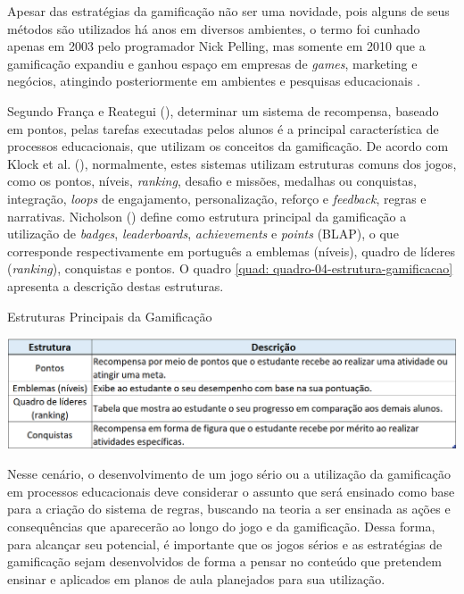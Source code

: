 Apesar das estratégias da gamificação não ser uma novidade, pois alguns de seus métodos são utilizados há anos em diversos ambientes, o termo foi cunhado apenas em 2003 pelo programador Nick Pelling, mas somente em 2010 que a gamificação expandiu e ganhou espaço em empresas de \textit{games}, marketing e negócios, atingindo posteriormente em ambientes e pesquisas educacionais \cite{alves2015}.

Segundo França e Reategui (\citeyear{franca2014}), determinar um sistema de recompensa, baseado em pontos, pelas tarefas executadas pelos alunos é a principal característica de processos educacionais, que utilizam os conceitos da gamificação. De acordo com Klock et al. (\citeyear{klock2014}), normalmente, estes sistemas utilizam estruturas comuns dos jogos, como os pontos, níveis, \textit{ranking}, desafio e missões, medalhas ou conquistas, integração, \textit{loops} de engajamento, personalização, reforço e \textit{feedback}, regras e narrativas. Nicholson (\citeyear{nicholson2012}) define como estrutura principal da gamificação a utilização de \textit{badges}, \textit{leaderboards}, \textit{achievements} e \textit{points} (BLAP), o que corresponde respectivamente em português a emblemas (níveis), quadro de líderes (\textit{ranking}), conquistas e pontos. O quadro \ref{quad: quadro-04-estrutura-gamificacao} apresenta a descrição destas estruturas.


\graphicspath{{quadros/}}
\begin{quadro}[!ht]
\centering
\begin{minipage}{1.\textwidth}
\caption{Estruturas Principais da Gamificação}
\centering
\includegraphics[width=1.0\textwidth]{quadro-04-estrutura-gamificacao.png}
\label{quad: quadro-04-estrutura-gamificacao}
\end{minipage}
\end{quadro}

Nesse cenário, o desenvolvimento de um jogo sério ou a utilização da gamificação em processos educacionais deve considerar o assunto que será ensinado como base para a criação do sistema de regras, buscando na teoria a ser ensinada as ações e consequências que aparecerão ao longo do jogo e da gamificação. Dessa forma, para alcançar seu potencial, é importante que os jogos sérios e as estratégias de gamificação sejam desenvolvidos de forma a pensar no conteúdo que pretendem ensinar e aplicados em planos de aula planejados para sua utilização.

